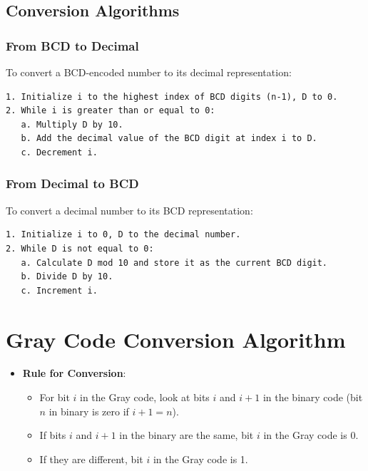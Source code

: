 \documentclass[12pt,openany, tikz,border=10pt]{book}
\begin{document}
	\subsection{Conversion Algorithms}
	
	\subsubsection{From BCD to Decimal}
	
	To convert a BCD-encoded number to its decimal representation:
	
	\begin{verbatim}
1. Initialize i to the highest index of BCD digits (n-1), D to 0.
2. While i is greater than or equal to 0:
   a. Multiply D by 10.
   b. Add the decimal value of the BCD digit at index i to D.
   c. Decrement i.
	\end{verbatim}
	
	\subsubsection{From Decimal to BCD}
	
	To convert a decimal number to its BCD representation:
	
	\begin{verbatim}
1. Initialize i to 0, D to the decimal number.
2. While D is not equal to 0:
   a. Calculate D mod 10 and store it as the current BCD digit.
   b. Divide D by 10.
   c. Increment i.
	\end{verbatim}
	
	\newpage
	\section{Gray Code Conversion Algorithm}
	\begin{itemize}
		\item[] \textbf{Rule for Conversion}:
		      \begin{itemize}
		      	\item[] For bit \( i \) in the Gray code, look at bits \( i \) and \( i+1 \) in the binary code (bit \( n \) in binary is zero if \( i+1 = n \)).
		      	\item[] If bits \( i \) and \( i+1 \) in the binary are the same, bit \( i \) in the Gray code is 0.
		      	\item[] If they are different, bit \( i \) in the Gray code is 1.
		      \end{itemize}
	\end{itemize}
	
\end{document}
